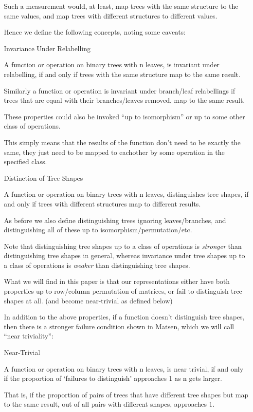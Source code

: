 \documentclass{article}
\begin{document}
Such a measurement would, at least, map trees with the same structure to the
same values, and map trees with different structures to different values.

Hence we define the following concepts, noting some caveats:

\begin{definition} Invariance Under Relabelling

	A function or operation on binary trees with n leaves, is invariant under
	relabelling, if and only if trees with the same structure map to the same
	result.

	Similarly a function or operation is invariant under branch/leaf
	relabellings if trees that are equal with their branches/leaves removed,
	map to the same result.

	These properties could also be invoked ``up to isomorphism'' or up to some
	other class of operations.

	This simply means that the results of the function don't need to be exactly
	the same, they just need to be mapped to eachother by some operation in the
	specified class.
\end{definition}

\begin{definition} Distinction of Tree Shapes

	A function or operation on binary trees with n leaves, distinguishes tree
	shapes, if and only if trees with different structures map to different
	results.

	As before we also define distinguishing trees ignoring leaves/branches, and
	distinguishing all of these up to isomorphism/permutation/etc.
\end{definition}

Note that distinguishing tree shapes up to a class of operations is
\emph{stronger} than distinguishing tree shapes in general, whereas invariance
under tree shapes up to a class of operations is \emph{weaker} than
distinguishing tree shapes.

What we will find in this paper is that our representations either have both
properties up to row/column permutation of matrices, or fail to distinguish
tree shapes at all. (and become near-trivial as defined below)

In addition to the above properties, if a function doesn't distinguish tree
shapes, then there is a stronger failure condition shown in Matsen, which we
will call ``near triviality'':

\begin{definition} Near-Trivial

	A function or operation on binary trees with n leaves, is near trivial, if
	and only if the proportion of `failures to distinguish' approaches 1 as n
	gets larger.

	That is, if the proportion of pairs of trees that have different tree
	shapes but map to the same result, out of all pairs with different shapes,
	approaches 1.
\end{definition}
\end{document}
